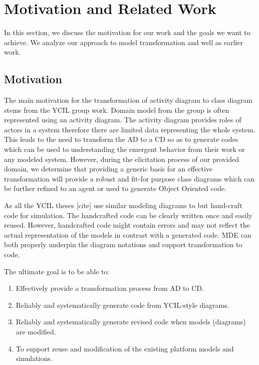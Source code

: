 \documentclass[10pt]{article}
\begin{document}
\section{Motivation and Related Work}

In this section, we discuss the motivation for our work and the goals we want to achieve. We analyze our approach to model transformation and well as earlier work.
	\subsection{Motivation}
	The main motivation for the transformation of activity diagram to class diagram stems from the YCIL group work. Domain model from the group is often represented using an activity diagram. The activity diagram provides roles of actors in a system therefore there are limited data representing the whole system. This leads to the need to transform the AD to a CD so as to generate codes which can be used to understanding the emergent behavior from their work or any modeled system. However, during the elicitation process of our provided domain, we determine that providing a generic basis for an effective transformation will provide a robust and fit-for purpose class diagrams which can be further refined to an agent or used to generate Object Oriented code.
	
As all the YCIL theses [cite] use similar modeling diagrams to but hand-craft code for simulation. The handcrafted code can be clearly written once and easily reused. However, handcrafted code might contain errors and may not reflect the actual representation of the models in contrast with a generated code. MDE can both properly underpin the diagram notations and support transformation to code.

The ultimate goal is to be able to:
\begin{enumerate}
\item Effectively provide a transformation process from AD to CD.
\item Reliably and systematically generate code from YCIL-style diagrams.
\item Reliably and systematically generate revised code when models (diagrams) are modified.
\item To support reuse and modiﬁcation of the existing platform models and simulations.
\end{enumerate}
\end{document}
